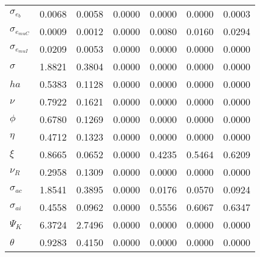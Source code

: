 \begin{center}
\begin{longtable}{lcccccc}
$ \sigma_{{e_b}}       $	 & 	          0.0068	 & 	          0.0058	 & 	          0.0000	 & 	          0.0000	 & 	          0.0000	 & 	          0.0003 \\ 
$ \sigma_{{e_{muC}}}   $	 & 	          0.0009	 & 	          0.0012	 & 	          0.0000	 & 	          0.0080	 & 	          0.0160	 & 	          0.0294 \\ 
$ \sigma_{{e_{muI}}}   $	 & 	          0.0209	 & 	          0.0053	 & 	          0.0000	 & 	          0.0000	 & 	          0.0000	 & 	          0.0000 \\ 
$ {\sigma}             $	 & 	          1.8821	 & 	          0.3804	 & 	          0.0000	 & 	          0.0000	 & 	          0.0000	 & 	          0.0000 \\ 
$ {ha}                 $	 & 	          0.5383	 & 	          0.1128	 & 	          0.0000	 & 	          0.0000	 & 	          0.0000	 & 	          0.0000 \\ 
$ \nu                  $	 & 	          0.7922	 & 	          0.1621	 & 	          0.0000	 & 	          0.0000	 & 	          0.0000	 & 	          0.0000 \\ 
$ {\phi}               $	 & 	          0.6780	 & 	          0.1269	 & 	          0.0000	 & 	          0.0000	 & 	          0.0000	 & 	          0.0000 \\ 
$ {\eta}               $	 & 	          0.4712	 & 	          0.1323	 & 	          0.0000	 & 	          0.0000	 & 	          0.0000	 & 	          0.0000 \\ 
$ \xi                  $	 & 	          0.8665	 & 	          0.0652	 & 	          0.0000	 & 	          0.4235	 & 	          0.5464	 & 	          0.6209 \\ 
$ {\nu_R}              $	 & 	          0.2958	 & 	          0.1309	 & 	          0.0000	 & 	          0.0000	 & 	          0.0000	 & 	          0.0000 \\ 
$ {\sigma_{ac}}        $	 & 	          1.8541	 & 	          0.3895	 & 	          0.0000	 & 	          0.0176	 & 	          0.0570	 & 	          0.0924 \\ 
$ {\sigma_{ai}}        $	 & 	          0.4558	 & 	          0.0962	 & 	          0.0000	 & 	          0.5556	 & 	          0.6067	 & 	          0.6347 \\ 
$ {\Psi_{K}}           $	 & 	          6.3724	 & 	          2.7496	 & 	          0.0000	 & 	          0.0000	 & 	          0.0000	 & 	          0.0000 \\ 
$ {\theta}             $	 & 	          0.9283	 & 	          0.4150	 & 	          0.0000	 & 	          0.0000	 & 	          0.0000	 & 	          0.0000 \\ 

\end{longtable}
\end{center}
